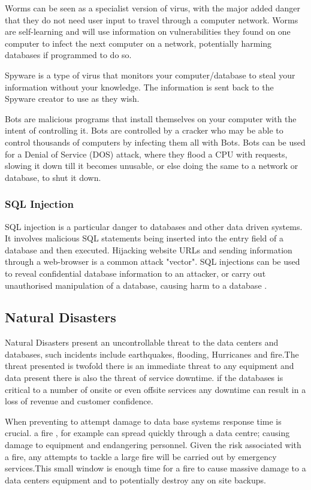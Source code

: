 \documentclass[11pt, twocolumn]{article}
\begin{document}
Worms can be seen as a specialist version of virus, with the major added danger that they do not need user input to travel through a computer network. Worms are self-learning and will use information on vulnerabilities they found on one computer to infect the next computer on a network, potentially harming databases if programmed to do so\cite{Bas}.

Spyware is a type of virus that monitors your computer/database to steal your information without your knowledge.  The information is sent back to the Spyware creator to use as they wish\cite{Bas}.

Bots are malicious programs that install themselves on your computer with the intent of controlling it.  Bots are controlled by a cracker who may be able to control thousands of computers by infecting them all with Bots.  Bots can be used for a Denial of Service (DOS) attack, where they flood a CPU with requests, slowing it down till it becomes unusable, or else doing the same to a network or database, to shut it down\cite{Bas}. 

\subsubsection{SQL Injection}
SQL injection is a particular danger to databases and other data driven systems.  It involves malicious SQL statements being inserted into the entry field of a database and then executed.  Hijacking website URLs and sending information through a web-browser is a common attack "vector".  SQL injections can be used to reveal confidential database information to an attacker, or carry out unauthorised manipulation of a database, causing harm to a database \cite{Bas}.


\subsection{Natural Disasters}

Natural Disasters present an uncontrollable threat to the data centers and databases, such incidents include earthquakes, flooding, Hurricanes and fire.The threat presented is twofold there is an immediate threat to any equipment and data present there is also the threat of service downtime. if the databases is critical to a number of onsite or even offsite services any downtime can result in a loss of revenue and customer confidence.

When preventing to attempt damage to data base systems response time is crucial. a fire , for example  can spread quickly through a data centre; causing damage to equipment and endangering personnel. Given the risk associated with a fire, any attempts to tackle a large fire will be carried out by emergency services.This small window is enough time for a fire to cause massive damage to a data centers equipment and to potentially destroy any on site backups.
\end{document}
